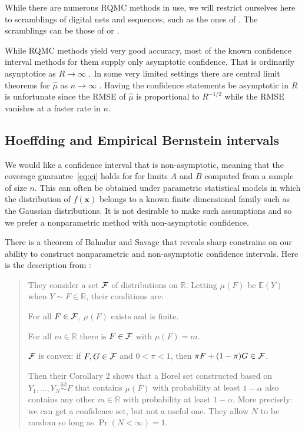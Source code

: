 \documentclass{article}
\newcommand{\real}{\mathbb{R}}
\newcommand{\e}{\mathbb{E}}
\newcommand{\bsx}{\boldsymbol{x}}
\begin{document}
While there are numerous RQMC methods in use, we
will restrict ourselves here to scramblings of digital nets
and sequences, such as the ones of \cite{Sob67}.
The scramblings can be those of \cite{Owe95} or
\cite{Mat98}.


While RQMC methods yield very good accuracy, most
of the known confidence interval methods for them
supply only asymptotic confidence. That is ordinarily
asynptotice as $R\to\infty$ \cite{naka:tuff:2024}.
In some very limited settings
there are central limit theorems for $\hat\mu$
as $n\to\infty$ \cite{Loh01}.
Having the confidence statements be asymptotic in $R$
is unfortunate since the RMSE of $\hat\mu$ 
is proportional to $R^{-1/2}$ while the RMSE
vanishes at a faster rate in $n$.



\subsection{Hoeffding and Empirical Bernstein intervals}

We would like a confidence interval that is non-asymptotic,
meaning that the coverage guarantee~\eqref{eq:ci} holds for 
for limits $A$ and $B$ computed from a sample of size $n$.
This can often be obtained under parametric statistical
models in which the distribution of $f(\bsx)$  belongs
to a known finite dimensional family such as the Gaussian
distributions.  It is not desirable to make such assumptions
and so we prefer a nonparametric method with non-asymptotic
confidence.  

There is a theorem of Bahadur and Savage \cite{BahSav56} that
reveals sharp constrains on our ability to construct
nonparametric and non-asymptotic confidence
intervals.  Here is the description from \cite{err4qmc}:
\begin{quote}They consider a set $\mathcal{F}$ of distributions on $\real$.
Letting $\mu(F)$ be $\e(Y)$ when $Y\sim F\in\real$, their conditions are:
\begin{compactenum}[\quad (i)]
\item For all $F\in\mathcal{F}$, $\mu(F)$ exists and is finite.
\item For all $m\in\real$ there is $F\in\mathcal{F}$ with $\mu(F)=m$.
\item $\mathcal{F}$ is convex: if $F,G\in\mathcal{F}$ and $0<\pi<1$,
  then $\pi F+(1-\pi)G\in \mathcal{F}$.
\end{compactenum}
Then their Corollary 2 shows that a Borel set constructed
based on $Y_1,\dots,Y_N\stackrel{\mathrm{iid}}
\sim F$
that contains $\mu(F)$ with probability at least $1-\alpha$
also contains any other $m\in\real$ with probability at least $1-\alpha$.
More precisely: we can get a confidence set, but not a useful one.
They allow $N$ to be random so long as $\Pr(N<\infty)=1$.
\end{quote}
\end{document}
